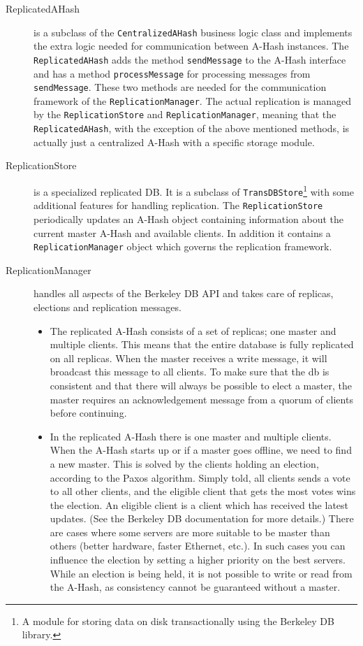 \documentclass{book}
\begin{document}
\begin{description}
    \item[ReplicatedAHash] %
	is a subclass of the \verb!CentralizedAHash! business logic class and implements the extra logic needed for communication between A-Hash instances. The \verb!ReplicatedAHash! adds the method \verb!sendMessage! to the A-Hash interface and has a method \verb!processMessage! for processing messages from \verb!sendMessage!. These two methods are needed for the communication framework of the \verb!ReplicationManager!. The actual replication is managed by the \verb!ReplicationStore! and \verb!ReplicationManager!, meaning that the \verb!ReplicatedAHash!, with the exception of the above mentioned methods, is actually just a centralized A-Hash with a specific storage module.
    \item[ReplicationStore] %
	is a specialized replicated DB. It is a subclass of \verb!TransDBStore!\footnote{A module for storing data on disk transactionally using the Berkeley DB library.} with some additional features for handling replication. The \verb!ReplicationStore! periodically updates an A-Hash object containing information about the current master A-Hash and available clients. In addition it contains a \verb!ReplicationManager! object which governs the replication framework.
    \item[ReplicationManager] %
	handles all aspects of the Berkeley DB API and takes care of replicas, elections and replication messages.
	\begin{itemize}
	\item The replicated A-Hash consists of a set of replicas; one master and multiple clients. This means that the entire database is fully replicated on all replicas. When the master receives a write message, it will broadcast this message to all clients. To make sure that the db is consistent and that there will always be possible to elect a master, the master requires an acknowledgement message from a quorum of clients before continuing.
	\item In the replicated A-Hash there is one master and multiple clients. When the A-Hash starts up or if a master goes offline, we need to find a new master. This is solved by the clients holding an election, according to the Paxos algorithm. Simply told, all clients sends a vote to all other clients, and the eligible client that gets the most votes wins the election. An eligible client is a client which has received the latest updates. (See the Berkeley DB documentation for more details.) There are cases where some servers are more suitable to be master than others (better hardware, faster Ethernet, etc.). In such cases you can influence the election by setting a higher priority on the best servers. While an election is being held, it is not possible to write or read from the A-Hash, as consistency cannot be guaranteed without a master.

\end{itemize}
\end{description}
\end{document}
